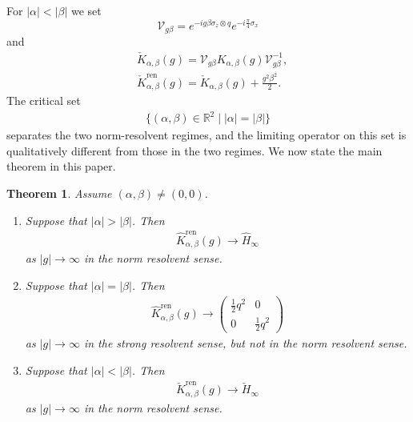 \documentclass[12pt,dvipdfmx]{article}
\newtheorem{theorem}{Theorem}[section]
\begin{document}
%
For $|\alpha|<|\beta|$ we set 
\[
    \mathcal{V}_{g\beta}
    =
    e^{-ig\beta \sigma_z \otimes q} e^{-i\frac{\pi}{4}\sigma_x}\]
    and  
    \begin{align*}
&\check{K}_{\alpha,\beta}(g)=        \mathcal{V}_{g\beta} K_{\alpha,\beta}(g) \mathcal{V}_{g\beta}^{-1},\\
&\check{K}_{\alpha,\beta}^\mathrm{ren}(g) =\check{K}_{\alpha,\beta}(g)+\frac{g^2 \beta^2}{2}.
\end{align*}
The critical set
\begin{align*}
\bigl\{(\alpha,\beta)\in\mathbb{R}^2
      \mid |\alpha|=|\beta|\bigr\}
\end{align*}
separates the two norm-resolvent regimes, and the limiting operator on
this set is qualitatively different from those in the two regimes.
%
We now state the main theorem in this paper. \begin{theorem}\label{thm:resolvent_conv}
Assume $(\alpha,\beta)\ne(0,0)$.
\begin{enumerate}
\item[(1)] Suppose that $|\alpha|>|\beta|$. 
Then 
\begin{align*}
\hat{K}_{\alpha,\beta}^\mathrm{ren}(g) 
\longrightarrow 
\hat{H}_\infty
\end{align*}
as $|g|\to\infty$ in the norm resolvent sense.

\item[(2)] Suppose that $|\alpha|=|\beta|$. Then
\begin{align*}
\hat{K}_{\alpha,\beta}^\mathrm{ren}(g) 
\longrightarrow 
    \begin{pmatrix}
        \frac12 q^2 & 0\\
        0 & \frac12 q^2
    \end{pmatrix}
\end{align*}
as $|g|\to\infty$ in the strong resolvent sense, but not in the norm resolvent sense.

\item[(3)] Suppose that $|\alpha|<|\beta|$. 
Then 
\begin{align*}
\check{K}_{\alpha,\beta}^\mathrm{ren}(g) 
\longrightarrow 
\check{H}_\infty
\end{align*}
as $|g|\to\infty$ in the norm resolvent sense.
\end{enumerate}
\end{theorem}
%
\end{document}
